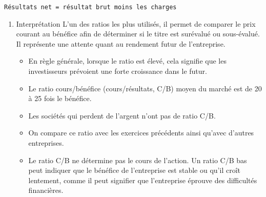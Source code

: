 \documentclass[11pt]{article}
\begin{document}
\begin{enumerate}
\begin{enumerate}
\begin{verbatim}
Résultats net = résultat brut moins les charges
\end{verbatim}
\begin{enumerate}
\item Interprétation
\label{sec:orgcea1f09}
L'un des ratios les plus utilisés, il permet de comparer le prix courant au
bénéfice afin de déterminer si le titre est surévalué ou sous-évalué. Il
représente une attente quant au rendement futur de l'entreprise.
\begin{itemize}
\item En règle générale, lorsque le ratio est élevé, cela signifie que les
investisseurs prévoient une forte croissance dans le futur.
\item Le ratio cours/bénéfice (cours/résultats, C/B) moyen du marché est de 20 à 25
fois le bénéfice.
\item Les sociétés qui perdent de l'argent n'ont pas de ratio C/B.
\item On compare ce ratio avec les exercices précédents ainsi qu’avec d’autres
entreprises.
\item Le ratio C/B ne détermine pas le cours de l'action. Un ratio C/B bas peut
indiquer que le bénéfice de l'entreprise est stable ou qu'il croît lentement,
comme il peut signifier que l'entreprise éprouve des difficultés financières.
\end{itemize}
\end{enumerate}
\end{enumerate}
\end{enumerate}
\end{document}
